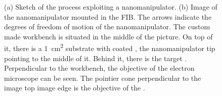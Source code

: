 	\begin{figure}[tp]
		\begin{subfigure}[t]{ 0.49\linewidth}
			\centering
			\caption{}
			\label{subfig::pp_sketch}
		\end{subfigure}
		\hfill
		\begin{subfigure}[t]{ 0.49\linewidth}
			\centering
			\caption{}
			\label{subfig::nanomanipulator_image}
		\end{subfigure}
		\caption{(a) Sketch of the \pp process exploiting a nanomanipulator. (b) Image of the nanomanipulator mounted in the FIB. The arrows indicate the degrees of freedom of motion of the nanomanipulator. The custom made workbench is situated in the middle of the picture. On top of it, there is a \SI{1}{\centi\meter\squared} substrate with coated \nds, the nanomanipulator tip pointing to the middle of it. Behind it, there is the target \vcsel. Perpendicular to the workbench, the objective of the electron microscope can be seen. The pointier cone perpendicular to the image top image edge is the objective of the \fib.}
	\end{figure}

